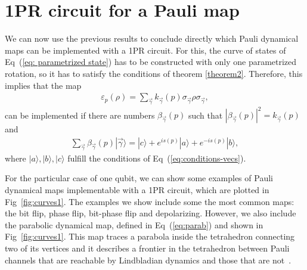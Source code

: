 \documentclass[10pt,letterpaper]{article} %
\newcommand{\fref}[1]{Fig~\ref{#1}}
\newcommand{\eref}[1]{Eq~(\ref{#1})}
\begin{document}
\section{1PR circuit for a Pauli map} %
\label{sec: 1PR circuit for a Pauli map}

We can now use the previous results to conclude directly which Pauli dynamical maps
can be implemented with a 1PR circuit.
For this, the curve of states of \eref{eq: parametrized state} 
has to be constructed with only one parametrized rotation,
so it has to satisfy the conditions of theorem \ref{theorem2}.
Therefore, this implies that the map
\begin{eqnarray}
\varepsilon_p(\rho) = \sum_{\vec{\gamma}} k_{\vec{\gamma}}(p) \sigma_{\vec{\gamma}} \rho \sigma_{\vec{\gamma}},
\end{eqnarray}
can be implemented  if there are numbers $\beta_{\vec{\gamma}}(p)$ such that $|\beta_{\vec{\gamma}}(p)|^2 = k_{\vec{\gamma}}(p)$ and
\begin{eqnarray}
\label{eq:vec}
\sum_{\vec{\gamma}} \beta_{\vec{\gamma}}(p) |\vec{\gamma}\rangle = |c\rangle +  e^{is(p)} |a\rangle + e^{-is(p)}|b\rangle,
\end{eqnarray}
where $|a\rangle,|b\rangle,|c\rangle$ fulfill
the conditions of \eref{eq:conditions-vecs}.

For the particular case of one qubit, we can show some examples of Pauli
dynamical maps implementable with a 1PR circuit, which are plotted in
\fref{fig:curves1}. 
The examples we show include some the most common maps: the bit flip, phase flip, bit-phase flip and depolarizing.
However, we also include the parabolic dynamical map,
defined in \eref{eq:parab} and shown in \fref{fig:curves1}.
This map traces a parabola inside the tetrahedron connecting two of its vertices
and it describes a frontier in the tetrahedron between Pauli channels
that are reachable by Lindbladian dynamics and those that are not~\cite{Davalos}.
\end{document}
